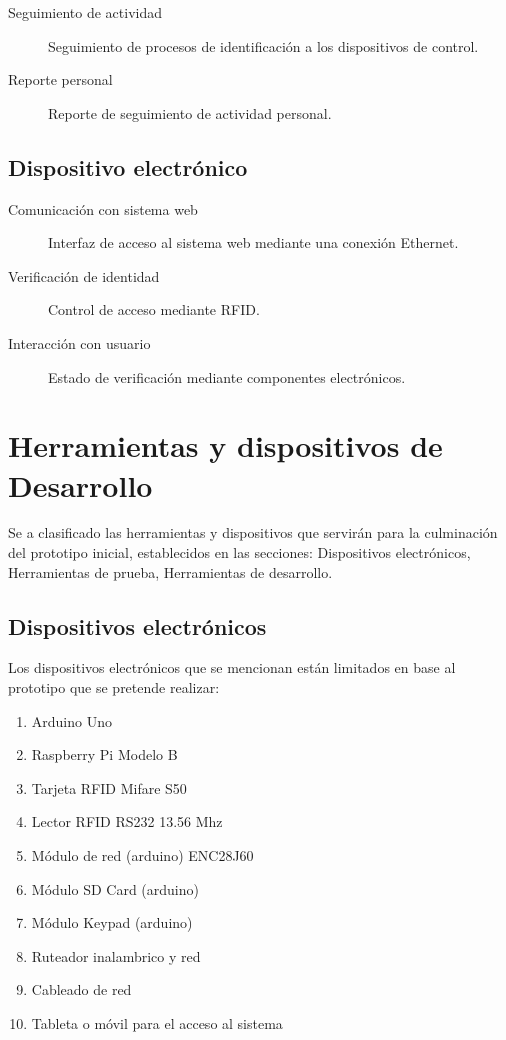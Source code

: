 \documentclass[11pt,twocolumn]{article}
\begin{document}
	 \begin{description}
		 \item[Seguimiento de actividad] Seguimiento de procesos de identificaci\'on 
		 a los dispositivos de control.
		 \item[Reporte personal] Reporte de seguimiento de actividad personal.
	 \end{description}
	
	\subsection{Dispositivo electr\'onico}
	
	 \begin{description}
		 \item[Comunicaci\'on con sistema web] Interfaz de acceso al sistema web 
		 mediante una conexi\'on Ethernet.
		 \item[Verificaci\'on de identidad] Control de acceso mediante RFID.
		 \item[Interacci\'on con usuario] Estado de verificaci\'on mediante 
		 componentes electr\'onicos.
	 \end{description}			

\section{Herramientas y dispositivos de Desarrollo}

Se a clasificado las herramientas y dispositivos que servir\'an para la 
culminaci\'on del prototipo inicial, establecidos en las secciones: Dispositivos 
electr\'onicos, Herramientas de prueba, Herramientas de desarrollo.

	\subsection{Dispositivos electr\'onicos }

	Los  dispositivos electr\'onicos que se mencionan est\'an limitados en base 
	al prototipo que se pretende realizar:\\
	
	\begin{enumerate}
		\item Arduino Uno
		\item Raspberry Pi Modelo B
		\item Tarjeta RFID Mifare S50
		\item Lector RFID RS232 13.56 Mhz
		\item M\'odulo de red (arduino) ENC28J60
		\item M\'odulo SD Card (arduino)
		\item M\'odulo Keypad (arduino)
		\item Ruteador inalambrico y red
		\item Cableado de red 
		\item Tableta o m\'ovil para el acceso al sistema
	\end{enumerate}
	
\end{document}
